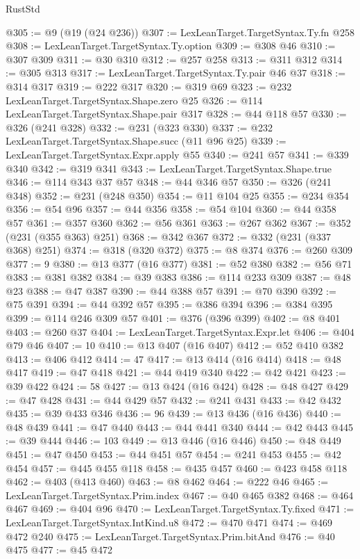 \begin{lexlean}{RustStd}
\begin{coremodule}
@305 := @9 (@19 (@24 @236))
@307 := LexLeanTarget.TargetSyntax.Ty.fn @258
@308 := LexLeanTarget.TargetSyntax.Ty.option
@309 := @308 @46
@310 := @307 @309
@311 := @30 @310
@312 := @257 @258
@313 := @311 @312
@314 := @305 @313
@317 := LexLeanTarget.TargetSyntax.Ty.pair @46 @37
@318 := @314 @317
@319 := @222 @317
@320 := @319 @69
@323 := @232 LexLeanTarget.TargetSyntax.Shape.zero @25
@326 := @114 LexLeanTarget.TargetSyntax.Shape.pair @317
@328 := @44 @118 @57
@330 := @326 (@241 @328)
@332 := @231 (@323 @330)
@337 := @232 LexLeanTarget.TargetSyntax.Shape.succ (@11 @96 @25)
@339 := LexLeanTarget.TargetSyntax.Expr.apply @55
@340 := @241 @57
@341 := @339 @340
@342 := @319 @341
@343 := LexLeanTarget.TargetSyntax.Shape.true
@346 := @114 @343 @37 @57
@348 := @44 @346 @57
@350 := @326 (@241 @348)
@352 := @231 (@248 @350)
@354 := @11 @104 @25
@355 := @234 @354
@356 := @54 @96
@357 := @44 @356
@358 := @54 @104
@360 := @44 @358 @57
@361 := @357 @360
@362 := @56 @361
@363 := @267 @362
@367 := @352 (@231 (@355 @363) @251)
@368 := @342 @367
@372 := @332 (@231 (@337 @368) @251)
@374 := @318 (@320 @372)
@375 := @8 @374
@376 := @260 @309
@377 := 9
@380 := @13 @377 (@16 @377)
@381 := @52 @380
@382 := @56 @71
@383 := @381 @382
@384 := @39 @383
@386 := @114 @233 @309
@387 := @48 @23
@388 := @47 @387
@390 := @44 @388 @57
@391 := @70 @390
@392 := @75 @391
@394 := @44 @392 @57
@395 := @386 @394
@396 := @384 @395
@399 := @114 @246 @309 @57
@401 := @376 (@396 @399)
@402 := @8 @401
@403 := @260 @37
@404 := LexLeanTarget.TargetSyntax.Expr.let
@406 := @404 @79 @46
@407 := 10
@410 := @13 @407 (@16 @407)
@412 := @52 @410 @382
@413 := @406 @412
@414 := 47
@417 := @13 @414 (@16 @414)
@418 := @48 @417
@419 := @47 @418
@421 := @44 @419 @340
@422 := @42 @421
@423 := @39 @422
@424 := 58
@427 := @13 @424 (@16 @424)
@428 := @48 @427
@429 := @47 @428
@431 := @44 @429 @57
@432 := @241 @431
@433 := @42 @432
@435 := @39 @433 @346
@436 := 96
@439 := @13 @436 (@16 @436)
@440 := @48 @439
@441 := @47 @440
@443 := @44 @441 @340
@444 := @42 @443
@445 := @39 @444
@446 := 103
@449 := @13 @446 (@16 @446)
@450 := @48 @449
@451 := @47 @450
@453 := @44 @451 @57
@454 := @241 @453
@455 := @42 @454
@457 := @445 @455 @118
@458 := @435 @457
@460 := @423 @458 @118
@462 := @403 (@413 @460)
@463 := @8 @462
@464 := @222 @46
@465 := LexLeanTarget.TargetSyntax.Prim.index
@467 := @40 @465 @382
@468 := @464 @467
@469 := @404 @96
@470 := LexLeanTarget.TargetSyntax.Ty.fixed
@471 := LexLeanTarget.TargetSyntax.IntKind.u8
@472 := @470 @471
@474 := @469 @472 @240
@475 := LexLeanTarget.TargetSyntax.Prim.bitAnd
@476 := @40 @475
@477 := @45 @472

\end{coremodule}
\end{lexlean}
